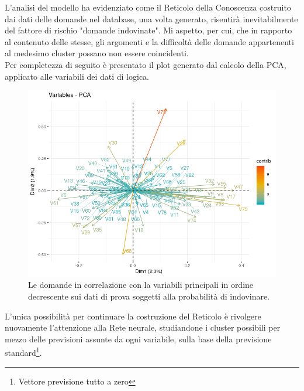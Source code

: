 \noindent L'analisi del modello ha evidenziato come il Reticolo della Conoscenza costruito  dai dati delle domande nel database, una volta generato, risentir\`a inevitabilmente del fattore di rischio "domande indovinate". Mi aspetto, per cui, che in rapporto al contenuto delle stesse, gli argomenti e la difficolt\`a  delle domande appartenenti al medesimo cluster possano non essere coincidenti.\\
\noindent
Per completezza di seguito \`e presentato il plot generato dal calcolo della PCA, applicato alle variabili dei dati di logica.
\begin{figure}[H]
\centering
	\includegraphics[width=1\linewidth]{../../PCA/plot/PCA_domande-logica.png}
	\caption{Le domande in correlazione con la variabili principali in ordine decrescente sui dati di prova soggetti alla probabilità di indovinare.}
	\label{Rappresentazione per mezzo di plot di come le variabili si presentano nelle due componenti principali con il calcolo della PCA - utilizzo del set delle domande di logica.}
\end{figure}
\noindent
L'unica possibilit\`a per continuare la costruzione del Reticolo \`e rivolgere nuovamente l'attenzione alla Rete neurale, studiandone i cluster possibili per mezzo delle previsioni assunte da ogni variabile, sulla base della previsione standard\footnote{Vettore previsione tutto a zero}.